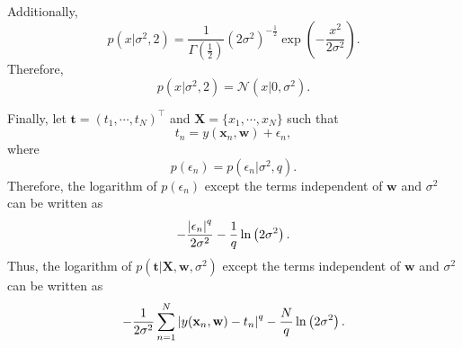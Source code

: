 Additionally,
%
\begin{equation}
p
\left(
	x 
	| 
	\sigma ^ 2, 
	2
\right)
=
\frac{1}{\Gamma(\frac{1}{2})}
\left(
	2 \sigma ^ 2
\right) ^ {- \frac{1}{2}}
\exp
\left(
	-
	\frac{x ^ 2}{2 \sigma ^ 2}
\right).
\end{equation}
%
Therefore,
%
\begin{equation}
p
\left(
	x 
	| 
	\sigma ^ 2, 
	2
\right)
=
\mathcal{N}
\left(
	x
	|
	0,
	\sigma ^ 2
\right).
\end{equation}
%

Finally, let $\mathbf{t} = (t_1, \cdots, t_N) ^ \intercal$ and $\mathbf{X} = \{ x_1, \cdots, x_N \}$ such that
%
\begin{equation}
t_n
=
y (\mathbf{x}_n, \mathbf{w})
+
\epsilon_n,
\end{equation}
%
where
%
\begin{equation}
p(\epsilon_n)
=
p
\left(
	\epsilon_n
	| 
	\sigma ^ 2, 
	q
\right).
\end{equation}
%
Therefore, the logarithm of $p(\epsilon_n)$ except the terms independent of $\mathbf{w}$ and $\sigma ^ 2$ can be written as
%
\begin{equation}
-
\frac{\abs{\epsilon_n} ^ q}{2 \sigma ^ 2}
-
\frac{1}{q}
\ln 
\left( 
	2 \sigma ^ 2 
\right).
\end{equation}
%
Thus, the logarithm of $p\left( \mathbf{t} |\mathbf{X}, \mathbf{w}, \sigma ^ 2 \right)$ except the terms independent of $\mathbf{w}$ and $\sigma ^ 2$ can be written as
%
\begin{equation}
-
\frac{1}{2 \sigma ^ 2}
\sum_{n = 1}^{N}
\abs{y (\mathbf{x}_n, \mathbf{w}) - t_n} ^ q
-
\frac{N}{q}
\ln 
\left( 
	2 \sigma ^ 2
\right).
\end{equation}
%


